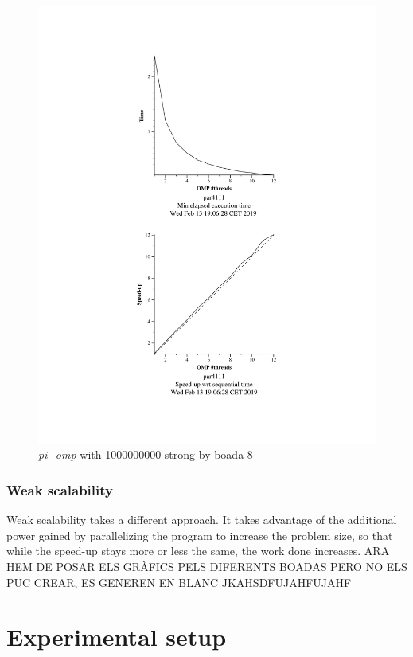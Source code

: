 \documentclass[12]{article}
\begin{document}
\begin{figure}[H]
\centering
\includegraphics[scale=0.5]{images/pi_omp-1000000000-1-12-3-strong-boada-8.png}
 \caption{ \textit{pi\_omp} with 1000000000 strong by boada-8}
 \label{fig:pi_ompboada8}
\end{figure}

\subsubsection{Weak scalability}

Weak scalability takes a different approach. It takes advantage of the additional power gained by parallelizing the program to increase the problem size, so that while the speed-up stays more or less the same, the work done increases.
ARA HEM DE POSAR ELS GRÀFICS PELS DIFERENTS BOADAS PERO NO ELS PUC CREAR, ES GENEREN EN BLANC JKAHSDFUJAHFUJAHF
\section{Experimental setup}
\end{document}
